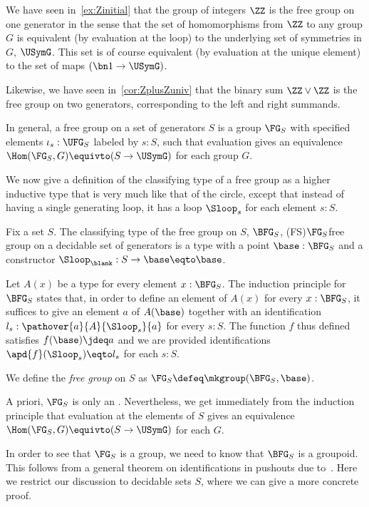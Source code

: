 We have seen in~\cref{ex:Zinitial} that the group of integers $\ZZ$
is the free group on one generator in the sense that the set of homomorphisms
from $\ZZ$ to any group $G$ is equivalent (by evaluation at the loop)
to the underlying set of symmetries in $G$, $\USymG$.
This set is of course equivalent (by evaluation at the unique element)
to the set of maps $(\bn 1 \to \USymG)$.

Likewise, we have seen in~\cref{cor:ZplusZuniv} that the binary sum $\ZZ \vee \ZZ$
is the free group on two generators, corresponding to the left and right summands.

In general, a free group on a set of generators $S$ is a group $\FG_S$ with
specified elements $\iota_s:\UFG_S$ labeled by $s:S$,
such that evaluation gives an equivalence $\Hom(\FG_S,G) \equivto (S \to \USymG)$
for each group $G$.

We now give a definition of the classifying type of a free group
as a higher inductive type that is very much like that of the circle,
except that instead of having a single generating loop,
it has a loop $\Sloop_s$ for each element $s:S$.
\begin{definition}
  \label{def:bfree}
  Fix a set $S$.
  The classifying type of the free group on $S$, $\BFG_S$,%
  \glossary(FS){$\protect\FG_S$}{free group on a decidable set of generators}
  is a type with a point $\base : \BFG_S$ and
  a constructor ${\Sloop_\blank} : S \to \base\eqto\base$.

  Let $A(x)$ be a type for every element $x:\BFG_S$.
  The induction principle for $\BFG_S$ states that,
  in order to define an element of $A(x)$ for every $x:\BFG_S$,
  it suffices to give an element $a$ of $A(\base)$ together
  with an identification $l_s:\pathover{a}{A}{\Sloop_s}{a}$
  for every $s:S$.
  The function $f$ thus defined satisfies $f(\base)\jdeq a$
  and we are provided identifications $\apd{f}(\Sloop_s)\eqto l_s$ for each $s:S$.

  We define the \emph{free group} on $S$ as $\FG_S \defeq \mkgroup(\BFG_S,\base)$.
\end{definition}

A priori, $\FG_S$ is only an \inftygp.
Nevertheless, we get immediately from the induction principle
that evaluation at the elements of $S$
gives an equivalence $\Hom(\FG_S,G) \equivto (S \to \USymG)$ for each
\inftygp $G$.

In order to see that $\FG_S$ is a group,
we need to know that $\BFG_S$ is a groupoid.
This follows from a general theorem on identifications in pushouts due to~\textcite{Warn2023}.
Here we restrict our discussion to decidable sets $S$,
where we can give a more concrete proof.

